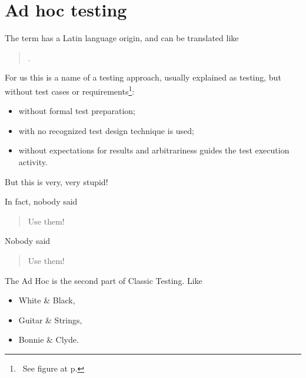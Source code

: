\section{Ad hoc testing}
\label{sec:Ad hoc testing}



The term  has a Latin language origin, and can be translated like 

	\begin{quote}
	.
	\end{quote} 

For us this is a name of a testing approach, usually explained as testing, but without test cases or requirements\footnote{~See figure  at p.\pageref{fig:ClassicAdHocExploratoryTesting}}:

\begin{itemize}
\item without formal test preparation;
\item with no recognized test design technique is used;
\item without expectations for results and arbitrariness guides the test execution activity. 
\end{itemize}

But this is very, very stupid!

In fact, nobody said 
\begin{quote}
Use them!
\end{quote} 

Nobody said 
\begin{quote}
Use them!
\end{quote} 

The Ad Hoc is the second part of Classic Testing. Like 
\begin{itemize}
\item 
White \& Black, 
\item 
Guitar \& Strings, 
\item 
Bonnie \& Clyde.
\end{itemize}

